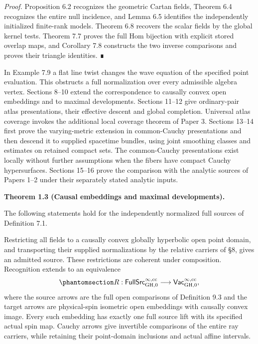 \documentclass[
  english,
  11pt,
  reqno]{amsart}
\makeatletter
\newcommand{\pandocstatementheading}[1]{%
  \par\addpenalty{\@beginparpenalty}%
  \addvspace{.5\baselineskip plus .2\baselineskip minus .2\baselineskip}%
  {\normalfont\bfseries #1\par}%
  \nobreak\@afterindenttrue\@afterheading
}
\makeatother
\begin{document}
\emph{Proof.} Proposition 6.2 recognizes the geometric Cartan fields,
Theorem 6.4 recognizes the entire null incidence, and Lemma 6.5
identifies the independently initialized finite-rank models. Theorem 6.8
recovers the scalar fields by the global kernel tests. Theorem 7.7
proves the full Hom bijection with explicit stored overlap maps, and
Corollary 7.8 constructs the two inverse comparisons and proves their
triangle identities. ∎

In Example 7.9 a flat line twist changes the wave equation of the
specified point evaluation. This obstructs a full normalization over
every admissible algebra vertex. Sections 8--10 extend the
correspondence to causally convex open embeddings and to maximal
developments. Sections 11--12 give ordinary-pair atlas presentations,
their effective descent and global completion. Universal atlas coverage
invokes the additional local coverage theorem of Paper 3. Sections
13--14 first prove the varying-metric extension in common-Cauchy
presentations and then descend it to supplied spacetime bundles, using
joint smoothing classes and estimates on retained compact sets. The
common-Cauchy presentations exist locally without further assumptions
when the fibers have compact Cauchy hypersurfaces. Sections 15--16 prove
the comparison with the analytic sources of Papers 1--2 under their
separately stated analytic inputs.

\pandocstatementheading{\protect{}\label{thm:global-causal-development-overview}Theorem 1.3 (Causal embeddings and maximal developments).}

The following statements hold for the independently normalized full
sources of Definition 7.1.

Restricting all fields to a causally convex globally hyperbolic open
point domain, and transporting their supplied normalizations by the
relative carriers of §8, gives an admitted source. These restrictions
are coherent under composition. Recognition extends to an equivalence
\begin{equation}\protect\phantomsection\label{eq:global-causal-correspondence-overview}{
R:\mathsf{FullSrc}^{\infty,\mathrm{cc}}_{\mathrm{GH},0}
\longrightarrow
\mathsf{Vac}^{\infty,\mathrm{cc}}_{\mathrm{GH},0},
}\end{equation} where the source arrows are the full open comparisons of
Definition 9.3 and the target arrows are physical-spin isometric open
embeddings with causally convex image. Every such embedding has exactly
one full source lift with its specified actual spin map. Cauchy arrows
give invertible comparisons of the entire ray carriers, while retaining
their point-domain inclusions and actual affine intervals.
\end{document}
